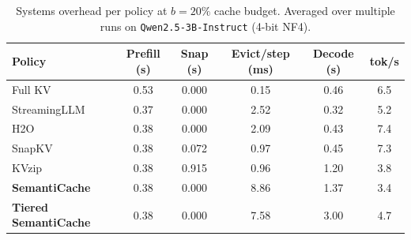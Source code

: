 \begin{table}[t]
\caption{Systems overhead per policy at $b{=}20\%$ cache budget.
Averaged over multiple runs on \texttt{Qwen2.5-3B-Instruct} (4-bit NF4).}
\label{tab:overhead}
\centering
\begin{tabular}{lccccc}
\toprule
Policy & Prefill (s) & Snap (s) & Evict/step (ms) & Decode (s) & tok/s \\
\midrule
Full KV & 0.53 & 0.000 & 0.15 & 0.46 & 6.5 \\
StreamingLLM & 0.37 & 0.000 & 2.52 & 0.32 & 5.2 \\
H2O & 0.38 & 0.000 & 2.09 & 0.43 & 7.4 \\
SnapKV & 0.38 & 0.072 & 0.97 & 0.45 & 7.3 \\
KVzip & 0.38 & 0.915 & 0.96 & 1.20 & 3.8 \\
\textbf{SemantiCache} & 0.38 & 0.000 & 8.86 & 1.37 & 3.4 \\
\textbf{Tiered SemantiCache} & 0.38 & 0.000 & 7.58 & 3.00 & 4.7 \\
\bottomrule
\end{tabular}
\end{table}